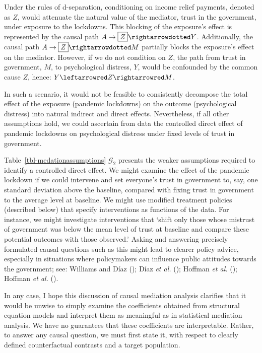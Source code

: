 \documentclass[
  single column]{article}
\begin{document}
Under the rules of d-separation, conditioning on income relief payments,
denoted as \(Z\), would attenuate the natural value of the mediator,
trust in the government, under exposure to the lockdowns. This blocking
of the exposure's effect is represented by the causal path
\(A \to \boxed{Z} \rightarrowdotted Y\). Additionally, the causal path
\(A \to \boxed{Z} \rightarrowdotted M\) partially blocks the exposure's
effect on the mediator. However, if we do not condition on \(Z\), the
path from trust in government, \(M\), to psychological distress, \(Y\),
would be confounded by the common cause \(Z\), hence:
\(Y \leftarrowred Z \rightarrowred M\).

In such a scenario, it would not be feasible to consistently decompose
the total effect of the exposure (pandemic lockdowns) on the outcome
(psychological distress) into natural indirect and direct effects.
Nevertheless, if all other assumptions hold, we could ascertain from
data the controlled direct effect of pandemic lockdowns on psychological
distress under fixed levels of trust in government.

Table~\ref{tbl-medationassumptions} \(\mathcal{G}_2\) presents the
weaker assumptions required to identify a controlled direct effect. We
might examine the effect of the pandemic lockdown if we could intervene
and set everyone's trust in government to, say, one standard deviation
above the baseline, compared with fixing trust in government to the
average level at baseline. We might use modified treatment policies
(described below) that specify interventions as functions of the data.
For instance, we might investigate interventions that `shift only those
whose mistrust of government was below the mean level of trust at
baseline and compare these potential outcomes with those observed.'
Asking and answering precisely formulated causal questions such as this
might lead to clearer policy advice, especially in situations where
policymakers can influence public attitudes towards the government; see:
Williams and Díaz (); Díaz \emph{et
al.} (); Hoffman \emph{et al.}
(); Hoffman \emph{et al.}
().

In any case, I hope this discussion of causal mediation analysis
clarifies that it would be unwise to simply examine the coefficients
obtained from structural equation models and interpret them as
meaningful as in statistical mediation analysis. We have no guarantees
that these coefficients are interpretable. Rather, to answer any causal
question, we must first state it, with respect to clearly defined
counterfactual contrasts and a target population.
\end{document}

